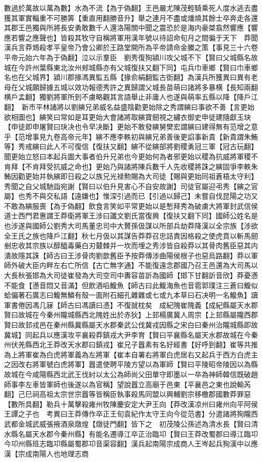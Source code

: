 數過於萬故以萬為數】水為不流【為于偽翻】王邑嚴尤陳茂輕騎乘死人度水逃去盡獲其軍實輜重不可勝筭【重直用翻勝音升】舉之連月不盡或燔燒其餘士卒奔走各還其郡王邑獨與所將長安勇敢數千人還洛陽關中聞之震恐於是海内豪桀翕然響應【響應若響之應聲也】皆殺其牧守自稱將軍用漢年號以待詔命旬月之間徧于天下　莽聞漢兵言莽鴆殺孝平皇帝乃會公卿於王路堂開所為平帝請命金縢之策【事見三十六卷平帝元始六年為于偽翻】泣以示羣臣　劉秀復狥潁川攻父城不下【賢曰父城縣名故城在今許州葉縣東北汝州郟城縣亦有父城復扶又翻下同】屯兵巾車鄉【賢曰巾車鄉名也在父城界】潁川郡掾馮異監五縣【掾俞絹翻監古衘翻】為漢兵所獲異曰異有老母在父城願歸據五城以效功報德秀許之異歸謂父城長苗萌曰諸將多暴横【長知兩翻横戶孟翻】獨劉將軍所到不虜略觀其言語舉止非庸人也遂與萌率五縣以降【降戶江翻】　新市平林諸將以劉縯兄弟威名益盛陰勸更始除之秀謂縯曰事欲不善【言更始欲相圖也】縯笑曰常如是耳更始大會諸將取縯寶劒視之繡衣御史申徒建隨獻玉玦【申徒即申屠賢曰玦决也令早决斷】更始不敢發縯舅樊宏謂縯曰建得無有范增之意乎【范增事見九卷高帝元年】縯不應李軼初與縯兄弟善後更諂事新貴【新貴謂朱鮪等】秀戒縯曰此人不可復信【復扶又翻】縯不從縯部將劉稷勇冠三軍【冠古玩翻】聞更始立怒曰本起兵圖大事者伯升兄弟也今更始何為者邪更始以稷為抗威將軍稷不肯拜【不肯拜受抗威之命也】更始乃與諸將陳兵數千人先收稷將誅之縯固爭李軼朱鮪因勸更始并執縯即日殺之以族兄光禄勲賜為大司徒【賜與更始同祖蒼梧太守利】秀聞之自父城馳詣宛謝【賢曰以伯升見害心不自安故謝】司徒官屬迎弔秀【縯之官屬】也秀不與交私語【遠嫌也】惟深引過而已【引過以歸己】未嘗自伐昆陽之功又不敢為縯服喪【為于偽翻】飲食言笑如平常更始以是慙拜秀為破虜大將軍封武信侯　道士西門君惠謂王莽衛將軍王涉曰讖文劉氏當復興【復扶又翻下同】國師公姓名是也涉遂與國師公劉秀大司馬董忠司中大贅孫伋謀以所部兵劫莽降漢以全宗族【涉欲全王氏之族也降戶江翻】秋七月伋以其謀告莽莽召忠詰責因格殺之使虎賁以斬馬劒剉忠收其宗族以醇醯毒藥白刃樷棘并一坎而埋之秀涉皆自殺莽以其骨肉舊臣惡其内潰故隱其誅【師古曰王涉骨肉劉歆舊臣予按莽傳涉曲陽侯根子也惡烏路翻】莽以軍師外破大臣内畔左右亡所信【古亡無字通】不能復遠念郡國乃召王邑還為大司馬以大長秋張邯為大司徒崔發為大司空司中夀容苗訢為國師【邯下甘翻訢音欣】莽憂懣不能食【懣音悶又音滿】但飲酒㗖鰒魚【師古曰此鰒海魚也音雹郭璞注三蒼曰鰒似蛤偏著石廣志曰鰒無鱗有殼一面附石細孔雜雜或七或九本草曰石决明一名鰒魚】讀軍書倦因馮几寐【師古曰馮讀曰憑】不復就枕矣　成紀隗崔隗義【成紀縣屬天水郡賢曰故城在今秦州隴城縣西北隗姓出於赤狄】上邽楊廣冀人周宗【上邽縣屬隴西郡賢曰故邽戎邑在秦州縣冀縣屬天水郡秦武公伐冀戎因縣之宋白曰秦州治隴城縣即故冀城】同起兵以應漢攻平襄殺莽鎮戎大尹李育【賢曰平襄縣名屬天水郡故城在今秦州伏羌縣西北王莽改天水郡曰鎮戎】崔兄子囂素有名好經書【好呼到翻】崔等共推為上將軍崔為白虎將軍義為左將軍【崔本自署右將軍白虎居右又起兵于西方白虎主之因改右將軍號白虎將軍】囂遣使聘平陵方望以為軍師【賢曰平陵昭帝陵因以為縣故城在今咸陽縣西北武王伐紂以太公為師尚父田單守即墨以一卒為神師韓信既破趙師事李左車皆軍師也後遂以為官稱】望說囂立高廟于邑東【平襄邑之東也說輸芮翻】己巳祠高祖太宗世宗囂等皆稱臣執事殺馬同盟以興輔劉宗移檄郡國數莽罪惡【數所具翻】勒兵十萬擊殺雍州牧陳慶安定大尹王向【莽改漢凉州曰雍州向平阿侯王譚之子也　考異曰王莽傳作卒正王旬袁紀作太守王向今從范書】分遣諸將狥隴西武都金城武威張掖酒泉燉煌【燉徒門翻】皆下之　初茂陵公孫述為清水長【賢曰清水縣名屬天水郡今秦州縣】有能名遷導江卒正治臨卭【賢曰王莽改蜀郡曰導江臨卭今卭州縣班志臨卭縣屬蜀郡卭音渠容翻】漢兵起南陽宗成商人王岑起兵狥漢中以應漢【宗成南陽人也地理志商